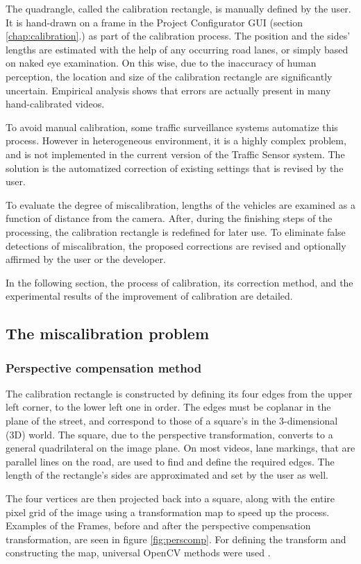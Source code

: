 The quadrangle, called the calibration rectangle, is manually defined by the user.
It is hand-drawn on a frame in the Project Configurator GUI (section \ref{chap:calibration}.) as part of the calibration process.
The position and the sides' lengths are estimated with the help of any occurring road lanes, or simply based on naked eye examination.
On this wise, due to the inaccuracy of human perception, the location and size of the calibration rectangle are significantly uncertain.
Empirical analysis shows that errors are actually present in many hand-calibrated videos.

To avoid manual calibration, some traffic surveillance systems automatize this process.
However in heterogeneous environment, it is a highly complex problem, and is not implemented in the current version of the Traffic Sensor system.
The solution is the automatized correction of existing settings that is revised by the user.

To evaluate the degree of miscalibration, lengths of the vehicles are examined as a function of distance from the camera.
After, during the finishing steps of the processing, the calibration rectangle is redefined for later use.
To eliminate false detections of miscalibration, the proposed corrections are revised and optionally affirmed by the user or the developer.

In the following section, the process of calibration, its correction method, and the experimental results of the improvement of calibration are detailed.

\subsection{The miscalibration problem}
\subsubsection{Perspective compensation method}
The calibration rectangle is constructed by defining its four edges from the upper left corner, to the lower left one in order.
The edges must be coplanar in the plane of the street, and correspond to those of a square's in the 3-dimensional (3D) world.
The square, due to the perspective transformation, converts to a general quadrilateral on the image plane.
On most videos, lane markings, that are parallel lines on the road, are used to find and define the required edges.
The length of the rectangle's sides are approximated and set by the user as well.

The four vertices are then projected back into a square, along with the entire pixel grid of the image using a transformation map to speed up the process.
Examples of the Frames, before and after the perspective compensation transformation, are seen in figure \ref{fig:perscomp}.
For defining the transform and constructing the map, universal OpenCV methods were used \cite{PersTrans, WrapPers}.

